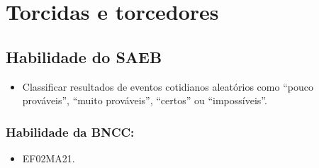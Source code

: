 \chapter{Torcidas e torcedores}


\section*{Habilidade do SAEB}

\begin{itemize}
\item Classificar resultados de eventos cotidianos aleatórios como ``pouco
prováveis'', ``muito prováveis'', ``certos'' ou ``impossíveis''.
\end{itemize}

\subsection{Habilidade da BNCC:}

\begin{itemize}
\item EF02MA21.
\end{itemize}

